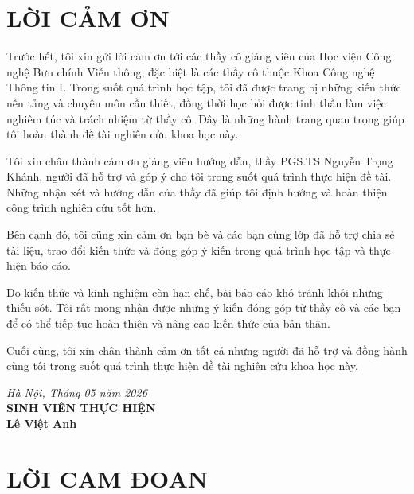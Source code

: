 \documentclass[12pt,a4paper,oneside]{report}
\begin{document}
\setcounter{page}{1}
\chapter*{LỜI CẢM ƠN}

Trước hết, tôi xin gửi lời cảm ơn tới các thầy cô giảng viên của Học viện Công nghệ Bưu chính Viễn thông, đặc biệt là các thầy cô thuộc Khoa Công nghệ Thông tin I. Trong suốt quá trình học tập, tôi đã được trang bị những kiến thức nền tảng và chuyên môn cần thiết, đồng thời học hỏi được tinh thần làm việc nghiêm túc và trách nhiệm từ thầy cô. Đây là những hành trang quan trọng giúp tôi hoàn thành đề tài nghiên cứu khoa học này.

Tôi xin chân thành cảm ơn giảng viên hướng dẫn, thầy PGS.TS Nguyễn Trọng Khánh, người đã hỗ trợ và góp ý cho tôi trong suốt quá trình thực hiện đề tài. Những nhận xét và hướng dẫn của thầy đã giúp tôi định hướng và hoàn thiện công trình nghiên cứu tốt hơn.

Bên cạnh đó, tôi cũng xin cảm ơn bạn bè và các bạn cùng lớp đã hỗ trợ chia sẻ tài liệu, trao đổi kiến thức và đóng góp ý kiến trong quá trình học tập và thực hiện báo cáo.

Do kiến thức và kinh nghiệm còn hạn chế, bài báo cáo khó tránh khỏi những thiếu sót. Tôi rất mong nhận được những ý kiến đóng góp từ thầy cô và các bạn để có thể tiếp tục hoàn thiện và nâng cao kiến thức của bản thân.

Cuối cùng, tôi xin chân thành cảm ơn tất cả những người đã hỗ trợ và đồng hành cùng tôi trong suốt quá trình thực hiện đề tài nghiên cứu khoa học này.

\vspace{1.5cm}
\begin{flushright}
    \textit{Hà Nội, Tháng 05 năm 2026} \\
    \textbf{SINH VIÊN THỰC HIỆN} \\
    \vspace{1.5cm}
    \textbf{Lê Việt Anh}
\end{flushright}

\newpage
\chapter*{LỜI CAM ĐOAN}
\end{document}
